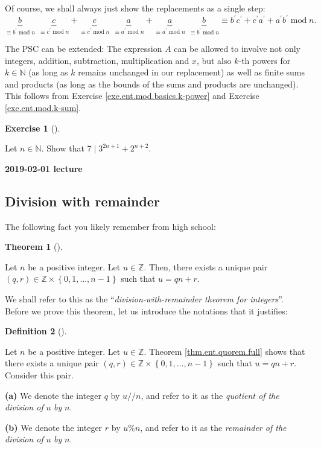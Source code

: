 \documentclass[numbers=enddot,12pt,final,onecolumn,notitlepage]{scrartcl}%
\newcounter{exer}
\numberwithin{exer}{subsection}
\theoremstyle{definition}
\newtheorem{theo}{Theorem}[subsection]
\newenvironment{theorem}[1][]
{\begin{theo}[#1]\begin{leftbar}}
{\end{leftbar}\end{theo}}
\newtheorem{defi}[theo]{Definition}
\newenvironment{definition}[1][]
{\begin{defi}[#1]\begin{leftbar}}
{\end{leftbar}\end{defi}}
\newtheorem{exmp}[exer]{Exercise}
\newenvironment{exercise}[1][]
{\begin{exmp}[#1]\begin{leftbar}}
{\end{leftbar}\end{exmp}}
\begin{document}
Of course, we shall always just show the replacements as a single step:%
\[
\underbrace{b}_{\equiv b^{\prime}\operatorname{mod}n}\ \ \underbrace{c}%
_{\equiv c^{\prime}\operatorname{mod}n}+\underbrace{c}_{\equiv c^{\prime
}\operatorname{mod}n}\ \ \underbrace{a}_{\equiv a^{\prime}\operatorname{mod}%
n}+\underbrace{a}_{\equiv a^{\prime}\operatorname{mod}n}\ \ \underbrace{b}%
_{\equiv b^{\prime}\operatorname{mod}n}\equiv b^{\prime}c^{\prime}+c^{\prime
}a^{\prime}+a^{\prime}b^{\prime}\operatorname{mod}n.
\]


The PSC can be extended: The expression $A$ can be allowed to involve not only
integers, addition, subtraction, multiplication and $x$, but also $k$-th
powers for $k\in\mathbb{N}$ (as long as $k$ remains unchanged in our
replacement) as well as finite sums and products (as long as the bounds of the
sums and products are unchanged). This follows from Exercise
\ref{exe.ent.mod.basics.k-power} and Exercise \ref{exe.ent.mod.k-sum}.

\begin{exercise}
\label{exe.ent.mod.substitutivity.7div}Let $n\in\mathbb{N}$. Show that
$7\mid3^{2n+1}+2^{n+2}$.
\end{exercise}

\begin{center}
\textbf{2019-02-01 lecture}
\end{center}

\subsection{\label{sect.ent.quorem}Division with remainder}

The following fact you likely remember from high school:

\begin{theorem}
\label{thm.ent.quorem.full}Let $n$ be a positive integer. Let $u\in\mathbb{Z}%
$. Then, there exists a unique pair $\left(  q,r\right)  \in\mathbb{Z}%
\times\left\{  0,1,\ldots,n-1\right\}  $ such that $u=qn+r$.
\end{theorem}

We shall refer to this as the \textquotedblleft\textit{division-with-remainder
theorem for integers}\textquotedblright. Before we prove this theorem, let us
introduce the notations that it justifies:

\begin{definition}
\label{def.ent.quorem}Let $n$ be a positive integer. Let $u\in\mathbb{Z}$.
Theorem \ref{thm.ent.quorem.full} shows that there exists a unique pair
$\left(  q,r\right)  \in\mathbb{Z}\times\left\{  0,1,\ldots,n-1\right\}  $
such that $u=qn+r$. Consider this pair.

\textbf{(a)} We denote the integer $q$ by $u//n$, and refer to it as the
\textit{quotient of the division of }$u$ \textit{by }$n$.

\textbf{(b)} We denote the integer $r$ by $u\%n$, and refer to it as the
\textit{remainder of the division of }$u$ \textit{by }$n$.
\end{definition}
\end{document}
